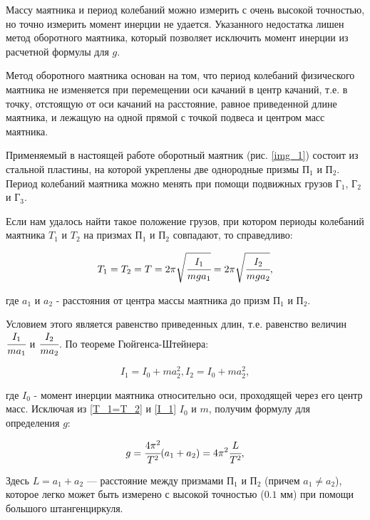 \documentclass[a4paper,12pt]{article}
\begin{document}
Массу маятника и период колебаний можно измерить с очень высокой точностью, но точно измерить момент инерции не удается. Указанного недостатка лишен метод оборотного маятника, который позволяет исключить момент инерции из расчетной формулы для $g$.

Метод оборотного маятника основан на том, что период колебаний физического маятника не изменяется при перемещении оси качаний в центр качаний, т.е. в точку, отстоящую от оси качаний на расстояние, равное приведенной длине маятника, и лежащую на одной прямой с точкой подвеса и центром масс маятника.

Применяемый в настоящей работе оборотный маятник (рис. \ref{img_1}) состоит из стальной пластины, на которой укреплены две однородные призмы П$_1$ и П$_2$. Период колебаний маятника можно менять при помощи подвижных грузов Г$_1$, Г$_2$ и Г$_3$.

Если нам удалось найти такое положение грузов, при котором периоды колебаний маятника $T_1$ и $T_2$  на призмах  П$_1$ и П$_2$ совпадают, то справедливо:
\begin{center}
	\vspace{-20pt}
	\begin{equation}
	T_1=T_2=T=2\pi \sqrt{\cfrac{I_1}{mga_1}}=2\pi \sqrt{\cfrac{I_2}{mga_2}},
	\label{T_1=T_2}
	\end{equation}
	\vspace{-20pt}
\end{center}
где $a_1$ и $a_2$ - расстояния от центра массы маятника до призм П$_1$ и П$_2$.

Условием этого является равенство приведенных длин, т.е. равенство величин $\cfrac{I_1}{ma_1}$ и $\cfrac{I_2}{ma_2}$. По теореме Гюйгенса-Штейнера:
\begin{center}
	\vspace{-20pt}
	\begin{equation}
	I_1=I_0+ma_{2}^2, I_2=I_0+ma_{2}^2,
	\label{I_1}
	\end{equation}
	\vspace{-20pt}
\end{center}
где $I_0$ - момент инерции маятника относительно оси, проходящей через его центр масс. Исключая из \eqref{T_1=T_2} и \eqref{I_1} $I_0$ и $m$, получим формулу для определения $g$:
\begin{center}
	\vspace{-20pt}
	\begin{equation}
	g = \cfrac{4\pi^2}{T^2}(a_1+a_2) = 4\pi^2 \cfrac{L}{T^2},
	\label{g}
	\end{equation}
	\vspace{-20pt}
\end{center}
Здесь $L=a_1+a_2$ — расстояние между призмами П$_1$ и П$_2$ (причем $a_1 \neq a_2$), которое легко может быть измерено с высокой точностью ($0.1$ мм) при помощи большого штангенциркуля.
\end{document}
